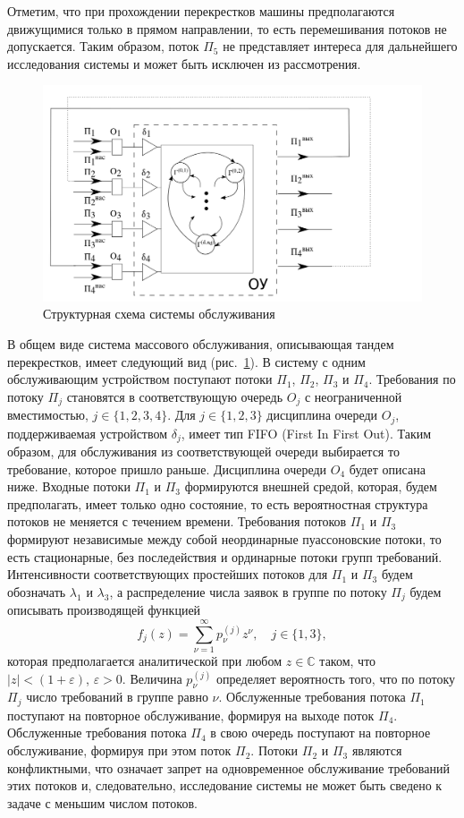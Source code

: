 \documentclass[11pt]{ubs}
\begin{document}
Отметим, что при прохождении перекрестков машины предполагаются движущимися только в прямом направлении, то есть перемешивания потоков не допускается. Таким образом, поток $\Pi_5$ не представляет интереса для дальнейшего исследования системы и может быть исключен из рассмотрения.
\begin{figure}[ht]
\includegraphics[scale=0.3]{SystemScheme.png} 
\caption{Структурная схема системы обслуживания}
\label{SystemScheme}
\end{figure}
В общем виде система массового обслуживания, описывающая тандем перекрестков, имеет следующий вид (рис.~\ref{SystemScheme}).
В систему с одним обслуживающим устройством поступают потоки $\Pi_1$, $\Pi_2$, $\Pi_3$  и $\Pi_4$. Требования по потоку $\Pi_j$ становятся в соответствующую очередь $O_j$ с неограниченной вместимостью, $j\in \{1, 2, 3, 4\}$. Для $j \in \{1, 2, 3\}$ дисциплина очереди $O_j$, поддерживаемая устройством $\delta_j$, имеет тип FIFO (First In First Out). Таким образом, для обслуживания из соответствующей очереди выбирается то требование, которое пришло раньше. Дисциплина очереди $O_4$ будет описана ниже. Входные потоки $\Pi_1$ и $\Pi_3$ формируются внешней средой, которая, будем предполагать, имеет только одно состояние, то есть вероятностная структура потоков не меняется с течением времени. Требования потоков $\Pi_1$ и $\Pi_3$ формируют независимые между собой неординарные пуассоновские потоки, то есть  стационарные, без последействия и ординарные потоки групп требований. Интенсивности соответствующих простейших потоков для $\Pi_1$ и $\Pi_3$ будем обозначать $\lambda_1$ и $\lambda_3$, а распределение числа заявок в группе по потоку $\Pi_j$ будем описывать производящей функцией
\begin{equation}
f_j(z) = \sum_{\nu=1}^{\infty} p_{\nu}^{(j)} z ^{\nu}, \quad j\in \{1,3\},
\label{GeneratingFunc}
\end{equation}
которая предполагается аналитической при любом $z\in \mathbb{C}$ таком, что $|z|<(1+\varepsilon)$, $\varepsilon>0$. Величина $p_{\nu}^{(j)}$ определяет вероятность того, что по потоку $\Pi_j$ число требований в группе равно $\nu$. Обслуженные требования потока $\Pi_1$ поступают на повторное обслуживание, формируя на выходе поток $\Pi_4$. Обслуженные требования потока $\Pi_4$ в свою очередь поступают на повторное обслуживание, формируя при этом поток $\Pi_2$. Потоки $\Pi_2$ и $\Pi_3$ являются конфликтными, что означает запрет на одновременное обслуживание требований этих потоков и, следовательно, исследование системы не может быть сведено к задаче с меньшим числом потоков. 
\end{document}
